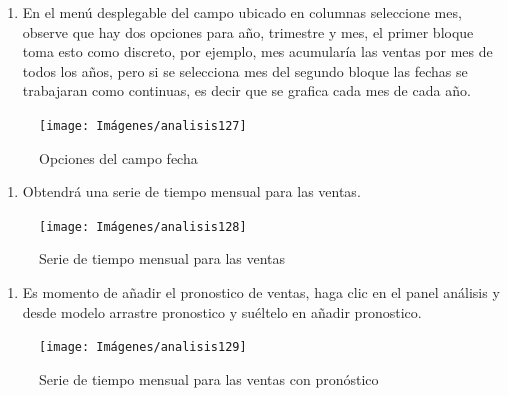 \documentclass[
]{book}
\providecommand{\tightlist}{%
  \setlength{\itemsep}{0pt}\setlength{\parskip}{0pt}}
\begin{document}
\begin{enumerate}
\def\labelenumi{\arabic{enumi}.}
\setcounter{enumi}{2}
\tightlist
\item
  En el menú desplegable del campo ubicado en columnas seleccione mes, observe que hay dos opciones para año, trimestre y mes, el primer bloque toma esto como discreto, por ejemplo, mes acumularía las ventas por mes de todos los años, pero si se selecciona mes del segundo bloque las fechas se trabajaran como continuas, es decir que se grafica cada mes de cada año.
\end{enumerate}

\begin{figure}

{\centering \texttt{[image: Imágenes/analisis127]} 

}

\caption{Opciones del campo fecha}\label{fig:paso3pronosticos-fig}
\end{figure}

\begin{enumerate}
\def\labelenumi{\arabic{enumi}.}
\setcounter{enumi}{3}
\tightlist
\item
  Obtendrá una serie de tiempo mensual para las ventas.
\end{enumerate}

\begin{figure}

{\centering \texttt{[image: Imágenes/analisis128]} 

}

\caption{Serie de tiempo mensual para las ventas}\label{fig:paso4pronosticos-fig}
\end{figure}

\begin{enumerate}
\def\labelenumi{\arabic{enumi}.}
\setcounter{enumi}{4}
\tightlist
\item
  Es momento de añadir el pronostico de ventas, haga clic en el panel análisis y desde modelo arrastre pronostico y suéltelo en añadir pronostico.
\end{enumerate}

\begin{figure}

{\centering \texttt{[image: Imágenes/analisis129]} 

}

\caption{Serie de tiempo mensual para las ventas con pronóstico}\label{fig:paso5pronosticos-fig}
\end{figure}
\end{document}
